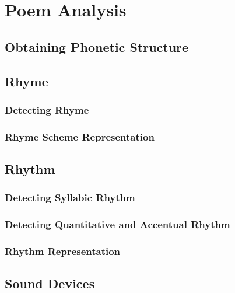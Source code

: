 \def\baselinestretch{1}
\chapter{Poem Analysis}
\ifpdf
    \graphicspath{{Theory/TheoryFigs/PNG/}{Theory/TheoryFigs/PDF/}{Theory/TheoryFigs/}}
\else
    \graphicspath{{Theory/TheoryFigs/EPS/}{Theory/TheoryFigs/}}
\fi

\def\baselinestretch{1.66}

\section{Obtaining Phonetic Structure}



\section{Rhyme}

\subsection{Detecting Rhyme}

\subsection{Rhyme Scheme Representation}



\section{Rhythm}

\subsection{Detecting Syllabic Rhythm}

\subsection{Detecting Quantitative and Accentual Rhythm}

\subsection{Rhythm Representation}



\section{Sound Devices}

